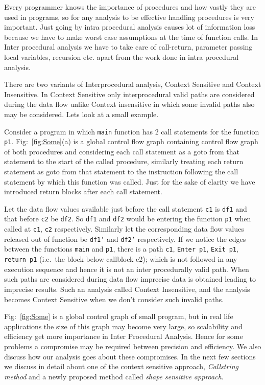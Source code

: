 Every programmer knows the importance of procedures and how vastly they are used in programs, so for any analysis 
to be effective handling procedures is very important. Just going by intra procedural analysis causes lot of information loss because we have to make
worst case assumptions at the time of function calls. In Inter procedural analysis we have to take care of call-return, parameter passing
local variables, recursion etc. apart from the work done in intra procedural analysis.

There are two variants of Interprocedural analysis, Context Sensitive 
and Context Insensitive. In Context Sensitive only interprocedural valid paths are considered during the data flow
unlike Context insensitive in which some invalid paths also may be considered. Lets look at a small example.

\begin{example}
Consider a program in which {\tt main} function has 2 call statements for the function {\tt p1}.
Fig:~\ref{fig:Some}(a) is a global control flow graph containing control flow graph of both procedures
and considering each call statement as a goto from that statement to the start of the called procedure,
similarly treating each return statement as goto from that statement to the instruction following
the call statement by which this function was called. Just for the sake of clarity
we have introduced return blocks after each call statement.

Let the data flow values available just before the call statement {\tt c1} is {\tt df1} and that before {\tt c2}
be {\tt df2}. So {\tt df1} and {\tt df2} would be entering the function {\tt p1} when called at {\tt c1}, {\tt c2} respectively. Similarly
let the corresponding data flow values released out of function be {\tt df1'} and {\tt df2'} respectively.
If we notice the edges between the functions {\tt main} and {\tt p1}, there is a path {\tt c1}, {\tt Enter p1}, {\tt Exit p1}, 
{\tt return p1} (i.e.\ the block below callblock c2); which is not followed in any execution sequence and hence it is not an inter procedurally
valid path. When such paths are considered during data flow imprecise data is obtained leading to
imprecise results. Such an analysis called Context Insensitive,  and  the analysis becomes Context Sensitive when we don't consider such invalid paths.
\end{example}

Fig:~\ref{fig:Some} is a global control graph of small program, but in real life applications the size of this graph
may become very large, so scalability and efficiency get more importance in Inter Procedural Analysis. Hence for some problems 
a compromise may be required between precision and efficiency. We also discuss how our analysis goes about these compromises.
In the next few sections we discuss in detail about one of the context sensitive approach, \textit{Callstring method} and a 
newly proposed method called \textit{shape sensitive approach}.
  
